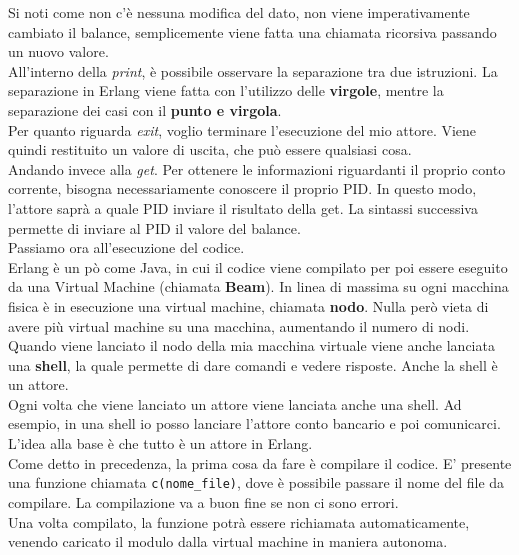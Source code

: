 \documentclass{article}
\begin{document}
Si noti come non c'è nessuna modifica del dato, non viene imperativamente cambiato il balance, semplicemente viene fatta una chiamata ricorsiva passando un nuovo valore.\vspace{14pt}\\
All'interno della \textit{print}, è possibile osservare la separazione tra due istruzioni. La separazione in Erlang viene fatta con l'utilizzo delle \textbf{virgole}, mentre la separazione dei casi con il \textbf{punto e virgola}.\vspace{14pt}\\
Per quanto riguarda \textit{exit}, voglio terminare l'esecuzione del mio attore. Viene quindi restituito un valore di uscita, che può essere qualsiasi cosa.\vspace{14pt}\\
Andando invece alla \textit{get}. Per ottenere le informazioni riguardanti il proprio conto corrente, bisogna necessariamente conoscere il proprio PID. In questo modo, l'attore saprà a quale PID inviare il risultato della get. La sintassi successiva permette di inviare al PID il valore del balance.\vspace{14pt}\\
Passiamo ora all'esecuzione del codice.\\
Erlang è un pò come Java, in cui il codice viene compilato per poi essere eseguito da una Virtual Machine (chiamata \textbf{Beam}). In linea di massima su ogni macchina fisica è in esecuzione una virtual machine, chiamata \textbf{nodo}. Nulla però vieta di avere più virtual machine su una macchina, aumentando il numero di nodi.\vspace{14pt}\\
Quando viene lanciato il nodo della mia macchina virtuale viene anche lanciata una \textbf{shell}, la quale permette di dare comandi e vedere risposte. Anche la shell è un attore.\\
Ogni volta che viene lanciato un attore viene lanciata anche una shell. Ad esempio, in una shell io posso lanciare l'attore conto bancario e poi comunicarci.\\
L'idea alla base è che tutto è un attore in Erlang.\vspace{14pt}\\
Come detto in precedenza, la prima cosa da fare è compilare il codice. E' presente una funzione chiamata \texttt{c(nome\_file)}, dove è possibile passare il nome del file da compilare. La compilazione va a buon fine se non ci sono errori.\\
Una volta compilato, la funzione potrà essere richiamata automaticamente, venendo caricato il modulo dalla virtual machine in maniera autonoma.\vspace{14pt}\\
\end{document}
